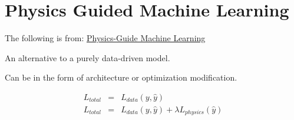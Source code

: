 	\chapter{Physics Guided Machine Learning}
The following is from: \href{https://www.youtube.com/watch?v=6yRHvCn0Y04}{Physics-Guide Machine Learning}

	\begin{bulletedlist}
		\item An alternative to a purely data-driven model.
		\item Can be in the form of architecture or optimization modification.
		\item
		\item
		\item
		\begin{bulletedlist}
			\item
		\end{bulletedlist}
	\end{bulletedlist}


	\begin{eqnarray}
		L_{total} & = & L_{data}\left(y, \hat{y}\right) \\
		L_{total} & = & L_{data}\left(y, \hat{y}\right) + \lambda L_{physics}\left(\hat{y}\right) \\
	\end{eqnarray}
	\begin{mathwhere}[0.4in]
	\end{mathwhere}
